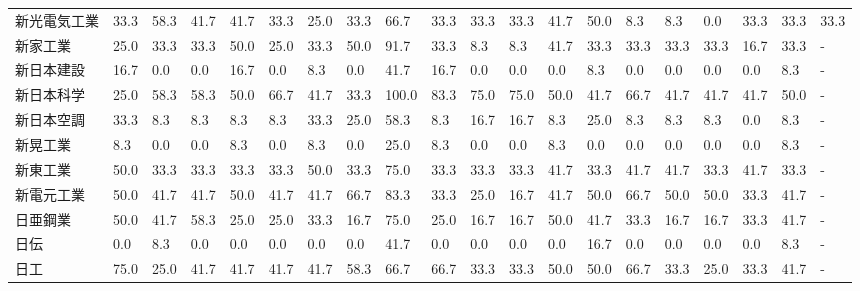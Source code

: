 \begin{tabular}{llllllllllllllllllll}
新光電気工業          &   33.3 &   58.3 &      41.7 &      41.7 &       33.3 &   25.0 &   33.3 &   66.7 &    33.3 &    33.3 &   33.3 &  41.7 &   50.0 &     8.3 &     8.3 &   0.0 &  33.3 &  33.3 &  33.3 \\
新家工業            &   25.0 &   33.3 &      33.3 &      50.0 &       25.0 &   33.3 &   50.0 &   91.7 &    33.3 &     8.3 &    8.3 &  41.7 &   33.3 &    33.3 &    33.3 &  33.3 &  16.7 &  33.3 &     - \\
新日本建設           &   16.7 &    0.0 &       0.0 &      16.7 &        0.0 &    8.3 &    0.0 &   41.7 &    16.7 &     0.0 &    0.0 &   0.0 &    8.3 &     0.0 &     0.0 &   0.0 &   0.0 &   8.3 &     - \\
新日本科学           &   25.0 &   58.3 &      58.3 &      50.0 &       66.7 &   41.7 &   33.3 &  100.0 &    83.3 &    75.0 &   75.0 &  50.0 &   41.7 &    66.7 &    41.7 &  41.7 &  41.7 &  50.0 &     - \\
新日本空調           &   33.3 &    8.3 &       8.3 &       8.3 &        8.3 &   33.3 &   25.0 &   58.3 &     8.3 &    16.7 &   16.7 &   8.3 &   25.0 &     8.3 &     8.3 &   8.3 &   0.0 &   8.3 &     - \\
新晃工業            &    8.3 &    0.0 &       0.0 &       8.3 &        0.0 &    8.3 &    0.0 &   25.0 &     8.3 &     0.0 &    0.0 &   8.3 &    0.0 &     0.0 &     0.0 &   0.0 &   0.0 &   8.3 &     - \\
新東工業            &   50.0 &   33.3 &      33.3 &      33.3 &       33.3 &   50.0 &   33.3 &   75.0 &    33.3 &    33.3 &   33.3 &  41.7 &   33.3 &    41.7 &    41.7 &  33.3 &  41.7 &  33.3 &     - \\
新電元工業           &   50.0 &   41.7 &      41.7 &      50.0 &       41.7 &   41.7 &   66.7 &   83.3 &    33.3 &    25.0 &   16.7 &  41.7 &   50.0 &    66.7 &    50.0 &  50.0 &  33.3 &  41.7 &     - \\
日亜鋼業            &   50.0 &   41.7 &      58.3 &      25.0 &       25.0 &   33.3 &   16.7 &   75.0 &    25.0 &    16.7 &   16.7 &  50.0 &   41.7 &    33.3 &    16.7 &  16.7 &  33.3 &  41.7 &     - \\
日伝              &    0.0 &    8.3 &       0.0 &       0.0 &        0.0 &    0.0 &    0.0 &   41.7 &     0.0 &     0.0 &    0.0 &   0.0 &   16.7 &     0.0 &     0.0 &   0.0 &   0.0 &   8.3 &     - \\
日工              &   75.0 &   25.0 &      41.7 &      41.7 &       41.7 &   41.7 &   58.3 &   66.7 &    66.7 &    33.3 &   33.3 &  50.0 &   50.0 &    66.7 &    33.3 &  25.0 &  33.3 &  41.7 &     - \\

\end{tabular}
